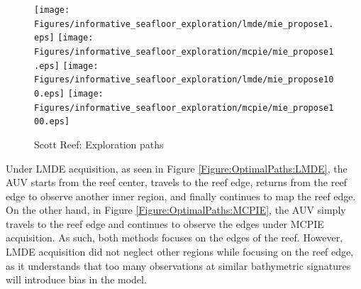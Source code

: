 				
			\captionsetup[subfigure]{position = top}
			\begin{figure}[!htbp]
			\centering
			  	\texttt{[image: Figures/informative\_seafloor\_exploration/lmde/mie\_propose1.eps]}
			  	\texttt{[image: Figures/informative\_seafloor\_exploration/mcpie/mie\_propose1.eps]}
			  	\texttt{[image: Figures/informative\_seafloor\_exploration/lmde/mie\_propose100.eps]}
				\texttt{[image: Figures/informative\_seafloor\_exploration/mcpie/mie\_propose100.eps]}
			\caption{Scott Reef: Exploration paths}
			\label{Figure:OptimalPaths}
			\end{figure}
			\captionsetup[subfigure]{position = bottom}
			
						
			Under LMDE acquisition, as seen in Figure \ref{Figure:OptimalPaths:LMDE}, the AUV starts from the reef center, travels to the reef edge, returns from the reef edge to observe another inner region, and finally continues to map the reef edge. On the other hand, in Figure \ref{Figure:OptimalPaths:MCPIE}, the AUV simply travels to the reef edge and continues to observe the edges under MCPIE acquisition. As such, both methods focuses on the edges of the reef. However, LMDE acquisition did not neglect other regions while focusing on the reef edge, as it understands that too many observations at similar bathymetric signatures will introduce bias in the model.
									
